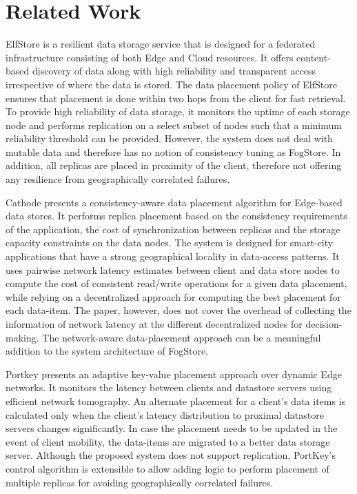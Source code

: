 \section{Related Work}
ElfStore\cite{elfstore} is a resilient data storage service that is designed for a federated infrastructure consisting of both Edge and Cloud resources. It offers content-based discovery of data along with high reliability and transparent access irrespective of where the data is stored. The data placement policy of ElfStore ensures that placement is done within two hops from the client for fast retrieval. To provide high reliability of data storage, it monitors the uptime of each storage node and performs replication on a select subset of nodes such that a minimum reliability threshold can be provided. However, the system does not deal with mutable data and therefore has no notion of consistency tuning as FogStore. In addition, all replicas are placed in proximity of the client, therefore not offering any resilience from geographically correlated failures.
\par Cathode \cite{cathode} presents a consistency-aware data placement algorithm for Edge-based data stores. It performs replica placement based on the consistency requirements of the application, the cost of synchronization between replicas and the storage capacity constraints on the data nodes. The system is designed for smart-city applications that have a strong geographical locality in data-access patterns. It uses pairwise network latency estimates between client and data store nodes to compute the cost of consistent read/write operations for a given data placement, while relying on a decentralized approach for computing the best  placement for each data-item. The paper, however, does not cover the overhead of collecting the information of network latency at the different decentralized nodes for decision-making. The network-aware data-placement approach can be a meaningful addition to the system architecture of FogStore.
\par Portkey \cite{portkey} presents an adaptive key-value placement approach over dynamic Edge networks. It monitors the latency between clients and datastore servers using efficient network tomography. An alternate placement for a client's data items is calculated only when the client’s latency distribution to proximal datastore servers changes significantly. In case the placement needs to be updated in the event of client mobility, the data-items are migrated to a better data storage server. Although the proposed system does not support replication, PortKey’s control algorithm is extensible to allow adding logic to perform placement of multiple replicas for avoiding geographically correlated failures.
